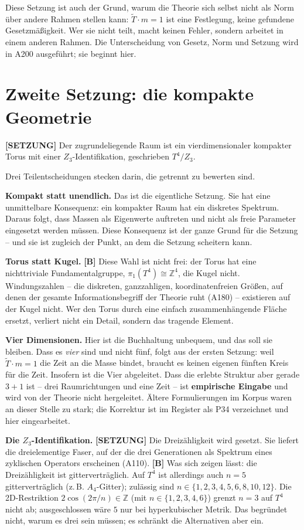 Diese Setzung ist auch der Grund, warum die Theorie sich selbst nicht als Norm
über andere Rahmen stellen kann: $\tilde T\cdot m = 1$ ist eine Festlegung,
keine gefundene Gesetzmäßigkeit. Wer sie nicht teilt, macht keinen Fehler,
sondern arbeitet in einem anderen Rahmen. Die Unterscheidung von Gesetz, Norm
und Setzung wird in A200 ausgeführt; sie beginnt hier.

\section{Zweite Setzung: die kompakte Geometrie}

\textbf{[SETZUNG]} Der zugrundeliegende Raum ist ein vierdimensionaler
kompakter Torus mit einer $Z_3$-Identifikation, geschrieben $T^4/Z_3$.

Drei Teilentscheidungen stecken darin, die getrennt zu bewerten sind.

\textbf{Kompakt statt unendlich.} Das ist die eigentliche Setzung. Sie hat eine
unmittelbare Konsequenz: ein kompakter Raum hat ein diskretes Spektrum. Daraus
folgt, dass Massen als Eigenwerte auftreten und nicht als freie Parameter
eingesetzt werden müssen. Diese Konsequenz ist der ganze Grund für die
Setzung -- und sie ist zugleich der Punkt, an dem die Setzung scheitern kann.

\textbf{Torus statt Kugel.} \textbf{[B]} Diese Wahl ist nicht frei: der Torus
hat eine nichttriviale Fundamentalgruppe, $\pi_1(T^4) \cong \mathbb{Z}^4$, die
Kugel nicht. Windungszahlen -- die diskreten, ganzzahligen, koordinatenfreien
Größen, auf denen der gesamte Informationsbegriff der Theorie ruht (A180) --
existieren auf der Kugel nicht. Wer den Torus durch eine einfach
zusammenhängende Fläche ersetzt, verliert nicht ein Detail, sondern das
tragende Element.

\textbf{Vier Dimensionen.} Hier ist die Buchhaltung unbequem, und das soll sie
bleiben. Dass es \emph{vier} sind und nicht fünf, folgt aus der ersten Setzung:
weil $\tilde T\cdot m = 1$ die Zeit an die Masse bindet, braucht es keinen
eigenen fünften Kreis für die Zeit. Insofern ist die Vier abgeleitet. Dass die
erlebte Struktur aber gerade $3+1$ ist -- drei Raumrichtungen und eine Zeit --
ist \textbf{empirische Eingabe} und wird von der Theorie nicht hergeleitet.
Ältere Formulierungen im Korpus waren an dieser Stelle zu stark; die Korrektur
ist im Register als P34 verzeichnet und hier eingearbeitet.

\textbf{Die $Z_3$-Identifikation.} \textbf{[SETZUNG]} Die Dreizähligkeit wird
gesetzt. Sie liefert die dreielementige Faser, auf der die drei Generationen
als Spektrum eines zyklischen Operators erscheinen (A110). \textbf{[B]} Was
sich zeigen lässt: die Dreizähligkeit ist gitterverträglich. Auf $T^4$ ist
allerdings auch $n=5$ gitterverträglich (z.\,B. $A_4$-Gitter); zulässig sind
$n \in \{1,2,3,4,5,6,8,10,12\}$. Die 2D-Restriktion $2\cos(2\pi/n) \in \mathbb{Z}$
(mit $n \in \{1,2,3,4,6\}$) grenzt $n=3$ auf $T^4$ nicht ab; ausgeschlossen wäre
$5$ nur bei hyperkubischer Metrik.
Das begründet nicht, warum es drei sein müssen; es schränkt die Alternativen
aber ein.

